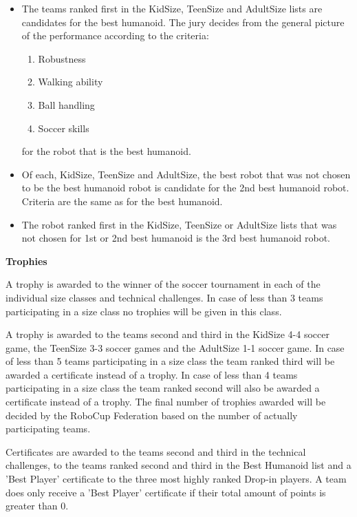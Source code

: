 \begin{itemize}
\item The teams ranked first in the KidSize, TeenSize and AdultSize lists are candidates for the best humanoid. The jury decides from the general picture of the performance according to the criteria:
\begin{enumerate}
\item Robustness
\item Walking ability
\item Ball handling
\item Soccer skills
\end{enumerate}
for the robot that is the best humanoid.
\item Of each, KidSize, TeenSize and AdultSize, the best robot that was not chosen to be the best humanoid robot is candidate for the 2nd best humanoid robot. Criteria are the same as for the best humanoid.
\item The robot ranked first in the KidSize, TeenSize or AdultSize lists that was not chosen for 1st or 2nd best humanoid is the 3rd best humanoid robot.
\end{itemize}

\bigskip

{\bfseries Trophies}

\headlinebox

A trophy is awarded to the winner of the soccer tournament in each of the individual size classes and technical challenges. In case of less than 3 teams participating in a size class no trophies will be given in this class.

\bigskip

A trophy is awarded to the teams second and third in the KidSize 4-4 soccer game, the TeenSize 3-3 soccer games and the AdultSize 1-1 soccer game. In case of less than 5 teams participating in a size class the team ranked third will be awarded a certificate instead of a trophy. In case of less than 4 teams participating in a size class the team ranked second will also be awarded a certificate instead of a trophy. The final number of trophies awarded will be decided by the RoboCup Federation based on the number of actually participating teams.

\bigskip

Certificates are awarded to the teams second and third in the technical challenges, to the teams ranked second and third in the Best Humanoid list and a 'Best Player' certificate to the three most highly ranked Drop-in players. A team does only receive a 'Best Player' certificate if their total amount of points is greater than 0.

